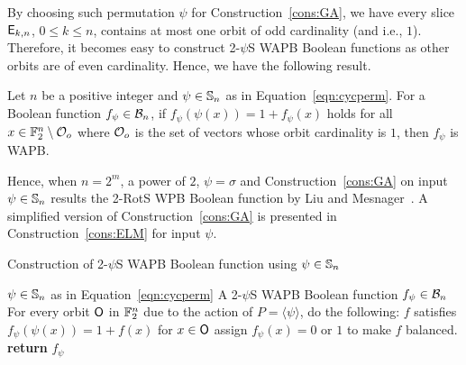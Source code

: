 \documentclass{llncs}
\begin{document}
By choosing such permutation $\psi$ for Construction~\ref{cons:GA}, we have every slice $\mathsf{E}_{k,n}$, $0 \leq k \leq n$, contains at most one orbit of odd cardinality (and i.e., $1$). Therefore, it becomes easy to construct 2-$\psi$S WAPB Boolean functions as other orbits are of even cardinality. Hence, we have the following result.
\begin{proposition}\label{prop:WAPB}
Let $n$ be a positive integer and $\psi \in \mathbb{S}_n$ as in Equation~\ref{eqn:cycperm}.
For a Boolean function $f_\psi \in \mathcal{B}_n$, if $f_\psi(\psi(x)) = 1+f_\psi(x)$ holds for all $x \in \mathbb{F}_2^n \setminus \mathcal{O}_o$ where $\mathcal{O}_o$ is the set of vectors whose orbit cardinality is $1$, then $f_\psi$ is WAPB.
\end{proposition}
Hence, when $n = 2^m$, a power of $2$, $\psi = \sigma$ and Construction~\ref{cons:GA} on input $\psi \in \mathbb{S}_n$ results the 2-RotS WPB Boolean function by Liu and Mesnager~\cite{DCC:LiuMes19}. A simplified version of Construction~\ref{cons:GA} is presented in Construction~\ref{cons:ELM} for input $\psi$.


\begin{constr}\label{cons:ELM}
\caption{Construction of 2-$\psi$S WAPB Boolean function using $\psi \in \mathbb{S}_n$}
\begin{algorithmic}%
\Require $\psi \in \mathbb{S}_n$ as in Equation~\ref{eqn:cycperm}
\Ensure A 2-$\psi$S WAPB Boolean function $f_\psi \in \mathcal{B}_n$
\State For every orbit $\mathsf{O}$ in $\mathbb{F}_2^n$ due to the action of $P = \langle \psi \rangle$, do the following:
	\State $f$ satisfies $f_\psi(\psi(x)) = 1+f(x)$ for $x \in \mathsf{O}$
\EndIf
{}
	\State assign $f_\psi(x) = 0$ or $1$ to make $f$ balanced.
\EndIf
\State \textbf{return} $f_\psi$
\end{algorithmic}
\end{constr}


\end{document}
